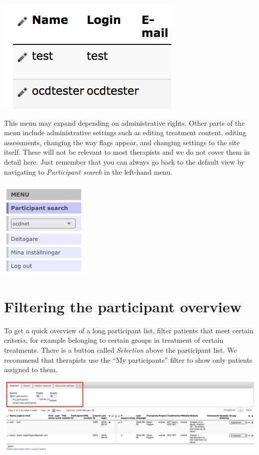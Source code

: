 \documentclass[]{book}
\theoremstyle{definition}
\theoremstyle{definition}
\theoremstyle{definition}
\theoremstyle{remark}
\begin{document}
\includegraphics{images/pencil.png}

This menu may expand depending on administrative rights. Other parts of
the menu include administrative settings such as editing treatment
content, editing assessments, changing the way flags appear, and
changing settings to the site itself. These will not be relevant to most
therapists and we do not cover them in detail here. Just remember that
you can always go back to the default view by navigating to
\emph{Participant search} in the left-hand menu.

\includegraphics{images/therapist-menu.png}

\hypertarget{filtering-the-participant-overview}{%
\section{Filtering the participant
overview}\label{filtering-the-participant-overview}}

To get a quick overview of a long participant list, filter patients that
meet certain criteria, for example belonging to certain groups in
treatment of certain treatments. There is a button called
\emph{Selection} above the participant list. We recommend that
therapists use the ``My participants'' filter to show only patients
assigned to them.

\includegraphics{images/filter-participants.png}
\end{document}
